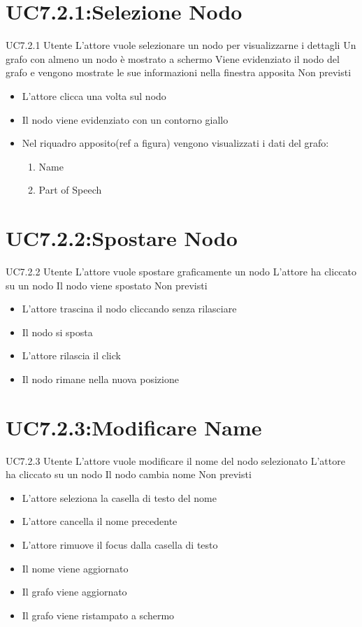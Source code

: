 \documentclass[../AnalisideiRequisiti.tex]{subfiles}
\begin{document}
\section{UC7.2.1:Selezione Nodo}
\UserCase
{UC7.2.1}
{Utente}
{}
{L'attore vuole selezionare un nodo per visualizzarne i dettagli}
{Un grafo con almeno un nodo è mostrato a schermo}
{Viene evidenziato il nodo del grafo e vengono mostrate le sue informazioni nella finestra apposita}
{Non previsti}
{
	\begin{itemize}
		\item{} L'attore clicca una volta sul nodo
		\item{} Il nodo viene evidenziato con un contorno giallo
		\item{} Nel riquadro apposito(ref a figura) vengono visualizzati i dati del grafo:
		\begin{enumerate}
			\item{} Name
			\item{} Part of Speech
		\end{enumerate}
	\end{itemize}
}
\section{UC7.2.2:Spostare Nodo}
\UserCase
{UC7.2.2}
{Utente}
{}
{L'attore vuole spostare graficamente un nodo}
{L'attore ha cliccato su un nodo }
{Il nodo viene spostato}
{Non previsti}
{\begin{itemize}
		\item{} L'attore trascina il nodo cliccando senza rilasciare
		\item{} Il nodo si sposta
		\item{} L'attore rilascia il click
		\item{} Il nodo rimane nella nuova posizione
\end{itemize}
}

\section{UC7.2.3:Modificare Name}
\UserCase
{UC7.2.3}
{Utente}
{}
{L'attore vuole modificare il nome del nodo selezionato}
{L'attore ha cliccato su un nodo }
{Il nodo cambia nome}
{Non previsti}
{\begin{itemize}
		\item{} L'attore seleziona la casella di testo del nome
		\item{} L'attore cancella il nome precedente
		\item{} L'attore rimuove il focus dalla casella di testo
		\item{} Il nome viene aggiornato
		\item{} Il grafo viene aggiornato 
		\item{} Il grafo viene ristampato a schermo 
\end{itemize}}
\end{document}
